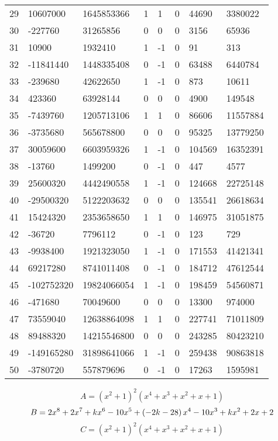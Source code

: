 \documentclass{amsart}
\begin{document}
\begin{longtable}{|l|l|l|lllll|}
29&10607000&1645853366&1&1&0&44690&3380022\\
30&-227760&31265856&0&0&0&3156&65936\\
31&10900&1932410&1&-1&0&91&313\\
32&-11841440&1448335408&0&-1&0&63488&6440784\\
33&-239680&42622650&1&-1&0&873&10611\\
34&423360&63928144&0&0&0&4900&149548\\
35&-7439760&1205713106&1&1&0&86606&11557884\\
36&-3735680&565678800&0&0&0&95325&13779250\\
37&30059600&6603959326&1&-1&0&104569&16352391\\
38&-13760&1499200&0&-1&0&447&4577\\
39&25600320&4442490558&1&-1&0&124668&22725148\\
40&-29500320&5122203632&0&0&0&135541&26618634\\
41&15424320&2353658650&1&1&0&146975&31051875\\
42&-36720&7796112&0&-1&0&123&729\\
43&-9938400&1921323050&1&-1&0&171553&41421341\\
44&69217280&8741011408&0&-1&0&184712&47612544\\
45&-102752320&19824066054&1&-1&0&198459&54560871\\
46&-471680&70049600&0&0&0&13300&974000\\
47&73559040&12638864098&1&1&0&227741&71011809\\
48&89488320&14215546800&0&0&0&243285&80423210\\
49&-149165280&31898641066&1&-1&0&259438&90863818\\
50&-3780720&557879696&0&-1&0&17263&1595981\\
\hline
\end{longtable}
$$A=(x^2
 + 1)^{2}(x^4
 + x^3
 + x^2
 + x
 + 1)$$
$$B=2\*x^8
 + 2\*x^7
 + k\*x^6
 - 10\*x^5
 + \left(-2\*k
 - 28\right) \*x^4
 - 10\*x^3
 + k\*x^2
 + 2\*x
 + 2$$
$$C=(x^2
 + 1)^{2}(x^4
 + x^3
 + x^2
 + x
 + 1)$$
\end{document}
